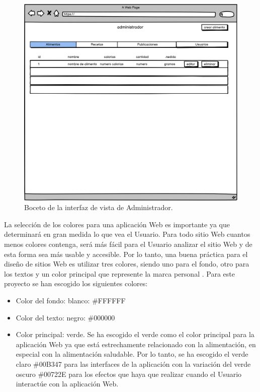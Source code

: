  

      \begin{figure}[H]
    \centering
    \includegraphics[scale=0.20]{img/vista-admin.jpg}
    \caption{Boceto de la interfaz de vista de Administrador.}
    \label{fig:vista-admin}
\end{figure}



 La selección de los colores para una aplicación Web es importante ya que determinará en gran medida lo que vea el Usuario. Para todo sitio Web cuantos menos colores contenga, será más fácil para el Usuario analizar el sitio Web y de esta forma sea más usable y accesible. Por lo tanto, una buena práctica para el diseño de sitios Web es utilizar tres colores, siendo uno para el fondo, otro para los textos y un color principal que represente la marca personal \cite{colores}. Para este proyecto se han escogido los siguientes colores:

 \begin{itemize}
     \item Color del fondo: blanco: \#FFFFFF
     \item Color del texto: negro: \#000000
     \item Color principal: verde. Se ha escogido el verde como el color principal para la aplicación Web ya que está estrechamente relacionado con la alimentación, en especial con la alimentación saludable. Por lo tanto, se ha escogido el verde claro \#00B347 para las interfaces de la aplicación con la variación del verde oscuro \#00722E para los efectos que haya que realizar cuando el Usuario interactúe con la aplicación Web.
 \end{itemize}

 